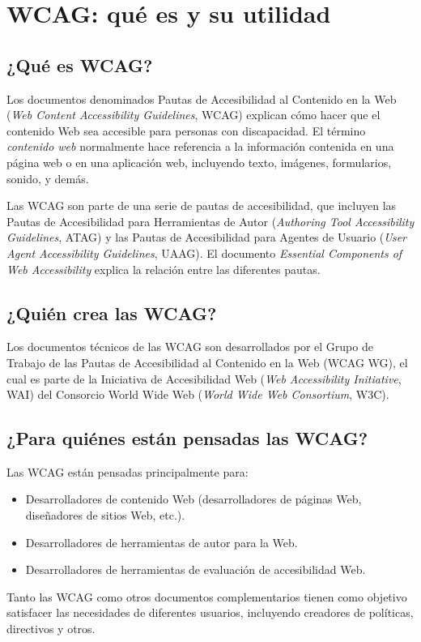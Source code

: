 \documentclass[]{article}
\begin{document}
\newpage

\section{WCAG: qué es y su utilidad}
\subsection*{¿Qué es WCAG?}

Los documentos denominados Pautas de Accesibilidad al Contenido en la Web (\textit{Web Content Accessibility Guidelines}, WCAG) explican cómo hacer que el contenido Web sea accesible para personas con discapacidad. El término \textit{contenido web} normalmente hace referencia a la información contenida en una página web o en una aplicación web, incluyendo texto, imágenes, formularios, sonido, y demás.

Las WCAG son parte de una serie de pautas de accesibilidad, que incluyen las Pautas de Accesibilidad para Herramientas de Autor (\textit{Authoring Tool Accessibility Guidelines}, ATAG) y las Pautas de Accesibilidad para Agentes de Usuario (\textit{User Agent Accessibility Guidelines}, UAAG). El documento \textit{Essential Components of Web Accessibility} explica la relación entre las diferentes pautas.

\subsection*{¿Quién crea las WCAG?}

Los documentos técnicos de las WCAG son desarrollados por el Grupo de Trabajo de las Pautas de Accesibilidad al Contenido en la Web (WCAG WG), el cual es parte de la Iniciativa de Accesibilidad Web (\textit{Web Accessibility Initiative}, WAI) del Consorcio World Wide Web (\textit{World Wide Web Consortium}, W3C).

\subsection*{¿Para quiénes están pensadas las WCAG?}
Las WCAG están pensadas principalmente para:
\begin{itemize}
	\item Desarrolladores de contenido Web (desarrolladores de páginas Web, diseñadores de sitios Web, etc.).
	\item Desarrolladores de herramientas de autor para la Web.
	\item Desarrolladores de herramientas de evaluación de accesibilidad Web.
\end{itemize}
Tanto las WCAG como otros documentos complementarios tienen como objetivo satisfacer las necesidades de diferentes usuarios, incluyendo creadores de políticas, directivos y otros.
\end{document}
